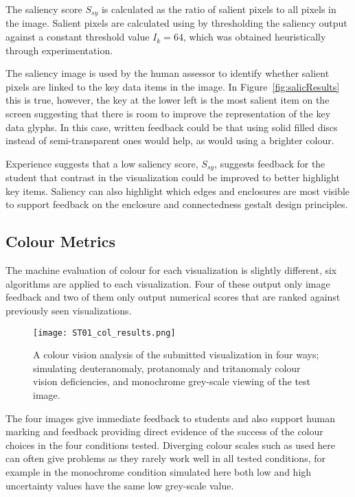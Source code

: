 The saliency score $S_{sy}$ is calculated as the ratio of salient pixels to all pixels in the image. Salient pixels are calculated using by thresholding the saliency output against a constant threshold value $I_k = 64$, which was obtained heuristically through experimentation.

The saliency image is used by the human assessor to identify whether salient pixels are linked to the key data items in the image. In Figure~\ref{fig:salicResults} this is true, however, the key at the lower left is the most salient item on the screen suggesting that there is room to improve the representation of the key data glyphs. In this case, written feedback could be that using solid filled discs instead of semi-transparent ones would help, as would using a brighter colour.

Experience suggests that a low saliency score, $S_{sy}$, suggests  feedback for the student that contrast in the visualization could be improved to better highlight key items. Saliency can also highlight which edges and enclosures are most visible to support feedback on the enclosure and connectedness gestalt design principles.

\subsection{Colour Metrics}

The machine evaluation of colour for each visualization is slightly different, six algorithms are applied to each visualization. Four of these output only image feedback and two of them only output numerical scores that are ranked against previously seen visualizations.
\begin{figure}[htb]
  \centering
  \texttt{[image: ST01\_col\_results.png]}

  \caption{\label{fig:colResults}
           A colour vision analysis of the submitted visualization in four ways; simulating deuteranomaly, protanomaly and tritanomaly colour vision deficiencies, and monochrome grey-scale viewing of the test image.}
\end{figure}

The four images give immediate feedback to students and also support human marking and feedback providing direct evidence of the success of the colour choices in the four conditions tested. Diverging colour scales such as used here can often give problems as they rarely work well in all tested conditions, for example in the monochrome condition simulated here both low and high uncertainty values have the same low grey-scale value.


